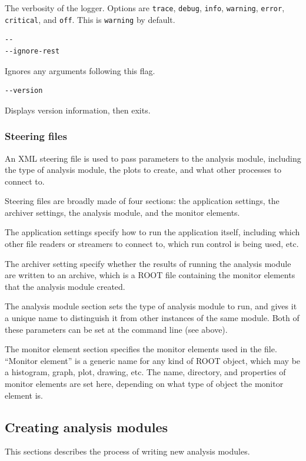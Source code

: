 The verbosity of the logger. Options are \texttt{trace}, \texttt{debug}, \texttt{info}, \texttt{warning}, \texttt{error}, \texttt{critical}, and \texttt{off}. This is \texttt{warning} by default.

\begin{lstlisting}
--
--ignore-rest
\end{lstlisting}

Ignores any arguments following this flag.

\begin{lstlisting}
--version
\end{lstlisting}

Displays version information, then exits.

\subsubsection{Steering files}
\label{section:steering-files}
An \acrshort{XML} steering file is used to pass parameters to the analysis module, including the type of analysis module, the plots to create, and what other processes to connect to. %

Steering files are broadly made of four sections: the application settings, the archiver settings, the analysis module, and the monitor elements.

The application settings specify how to run the application itself, including which other file readers or streamers to connect to, which run control is being used, etc. 

The archiver setting specify whether the results of running the analysis module are written to an archive, which is a ROOT file containing the monitor elements that the analysis module created.

The analysis module section sets the type of analysis module to run, and gives it a unique name to distinguish it from other instances of the same module. Both of these parameters can be set at the command line (see above).

The monitor element section specifies the monitor elements used in the file. ``Monitor element'' is a generic name for any kind of ROOT object, which may be a histogram, graph, plot, drawing, etc. The name, directory, and properties of monitor elements are set here, depending on what type of object the monitor element is.

\subsection{Creating analysis modules}
This sections describes the process of writing new analysis modules.

